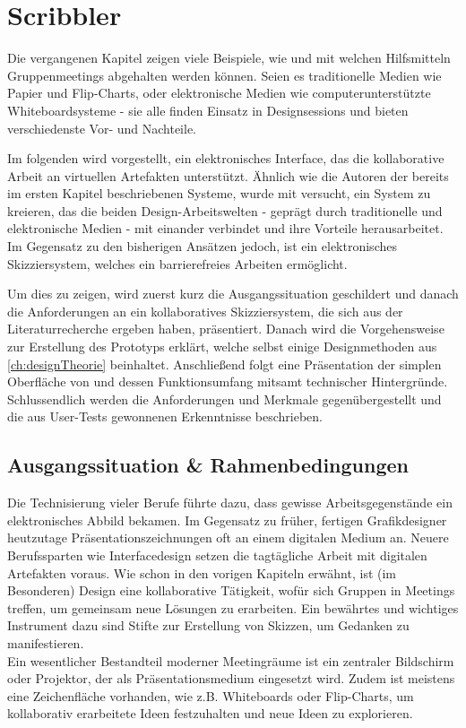 \chapter{Scribbler}\label{ch:scribbler} 

Die vergangenen Kapitel zeigen viele Beispiele, wie und mit welchen Hilfsmitteln Gruppenmeetings abgehalten werden können. Seien es traditionelle Medien wie Papier und Flip-Charts, oder elektronische Medien wie computerunterstützte Whiteboardsysteme - sie alle finden Einsatz in Designsessions und bieten verschiedenste Vor- und Nachteile.

\medskip Im folgenden wird \scribbler vorgestellt, ein elektronisches Interface, das die kollaborative Arbeit an virtuellen Artefakten unterstützt. Ähnlich wie die Autoren der bereits im ersten Kapitel beschriebenen Systeme, wurde mit \scribbler versucht, ein System zu kreieren, das die beiden Design-Arbeitswelten - geprägt durch traditionelle und elektronische Medien - mit einander verbindet und ihre Vorteile herausarbeitet. Im Gegensatz zu den bisherigen Ansätzen jedoch, ist \scribbler ein elektronisches Skizziersystem, welches ein barrierefreies Arbeiten ermöglicht.

\medskip Um dies zu zeigen, wird zuerst kurz die Ausgangssituation geschildert und danach die Anforderungen an ein kollaboratives Skizziersystem, die sich aus der Literaturrecherche ergeben haben, präsentiert. Danach wird die Vorgehensweise zur Erstellung des Prototyps erklärt, welche selbst einige Designmethoden aus \autoref{ch:designTheorie} beinhaltet. Anschließend folgt eine Präsentation der simplen Oberfläche von \scribbler und dessen Funktionsumfang mitsamt technischer Hintergründe. Schlussendlich werden die Anforderungen und Merkmale gegenübergestellt und die aus User-Tests gewonnenen Erkenntnisse beschrieben.

\section{Ausgangssituation \& Rahmenbedingungen} \label{sec:ausgangssituation} 
Die Technisierung vieler Berufe führte dazu, dass gewisse Arbeitsgegenstände ein elektronisches Abbild bekamen. Im Gegensatz zu früher, fertigen Grafikdesigner heutzutage Präsentationszeichnungen oft an einem digitalen Medium an. Neuere Berufssparten wie Interfacedesign setzen die tagtägliche Arbeit mit digitalen Artefakten voraus. Wie schon in den vorigen Kapiteln erwähnt, ist (im Besonderen) Design eine kollaborative Tätigkeit, wofür sich Gruppen in Meetings treffen, um gemeinsam neue Lösungen zu erarbeiten. Ein bewährtes und wichtiges Instrument dazu sind Stifte zur Erstellung von Skizzen, um Gedanken zu manifestieren.\\
Ein wesentlicher Bestandteil moderner Meetingräume ist ein zentraler Bildschirm oder Projektor, der als Präsentationsmedium eingesetzt wird. Zudem ist meistens eine Zeichenfläche vorhanden, wie z.B. Whiteboards oder Flip-Charts, um kollaborativ erarbeitete Ideen festzuhalten und neue Ideen zu explorieren.

